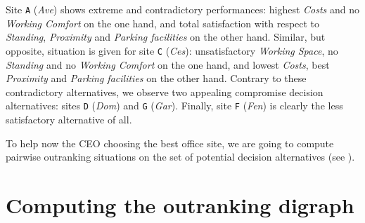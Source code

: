 Site \texttt{A} (\emph{Ave}) shows extreme and contradictory performances: highest \emph{Costs} and no \emph{Working Comfort} on the one hand, and total satisfaction with respect to \emph{Standing}, \emph{Proximity} and \emph{Parking facilities} on the other hand. Similar, but opposite, situation is given for site \texttt{C} (\emph{Ces}): unsatisfactory \emph{Working Space}, no \emph{Standing} and no \emph{Working Comfort} on the one hand, and lowest \emph{Costs}, best \emph{Proximity} and \emph{Parking facilities} on the other hand. Contrary to these contradictory alternatives, we observe two appealing compromise decision alternatives: sites \texttt{D} (\emph{Dom}) and \texttt{G} (\emph{Gar}). Finally, site \texttt{F} (\emph{Fen}) is clearly the less satisfactory alternative of all.

To help now the CEO choosing the best office site, we are going to compute pairwise outranking situations on the set of potential decision alternatives (see \citet{BIS-2013}).

\section{Computing the outranking digraph}
\label{sec:4.2}

